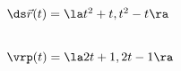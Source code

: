 {$\ds \vec r(t) = \la t^2+t, t^2-t\ra$
}
{
\begin{minipage}{\linewidth}
\\
$\vrp(t) = \la 2t+1,2t-1\ra$
\end{minipage}
}


